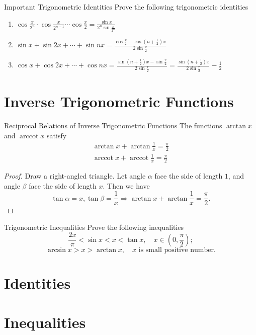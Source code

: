 \begin{example}{Important Trigonometric Identities}{}
  Prove the following trigonometric identities
 \begin{enumerate}
  \item $\cos \frac{x}{2^n} \cdot \cos \frac{x}{2^{n-1}} \cdots \cos \frac{x}{2}    = \frac{\sin x}{2^n \sin \frac{x}{2^n}}$
  \item $\sin x + \sin 2x + \cdots + \sin nx = \frac{\cos \frac{x}{2} - \cos(n + \frac{1}{2})x}{2 \sin \frac{x}{2}}$
  \item $\cos x + \cos 2x + \cdots + \cos nx = \frac{\sin (n+\frac{1}{2})x - \sin \frac{x}{2}}{2\sin \frac{x}{2}} = \frac{\sin(n+\frac{1}{2})x}{2 \sin \frac{x}{2}} - \frac{1}{2}$
  \end{enumerate}
\end{example}

\section{Inverse Trigonometric Functions}

\begin{proposition}{Reciprocal Relations of Inverse Trigonometric Functions}{}
  The functions $\arctan x$ and $\operatorname{arccot} x$ satisfy
  \begin{gather}
    \arctan x + \arctan \frac{1}{x} = \frac{\pi}{2}\\
    \operatorname{arccot}x + \operatorname{arccot}\frac{1}{x} = \frac{\pi}{2}
  \end{gather}
\end{proposition}

\begin{proof}
  Draw a right-angled triangle. Let angle $\alpha$ face the side of length $1$,
  and angle $\beta$ face the side of length $x$.
  Then we have
  \begin{equation}
    \tan \alpha = x, \tan \beta = \frac{1}{x} \Rightarrow
    \arctan x + \arctan \frac{1}{x} = \frac{\pi}{2}.
  \end{equation}
\end{proof}

\begin{example}{Trigonometric Inequalities}{}
  Prove the following inequalities
  \begin{equation}
    \frac{2x}{\pi} < \sin x < x < \tan x, \quad x \in (0, \frac{\pi}{2});
  \end{equation}
  \begin{equation}
    \arcsin x > x > \arctan x, \quad x \text{ is small positive number}.
  \end{equation}
\end{example}


\section{Identities}

\section{Inequalities}






